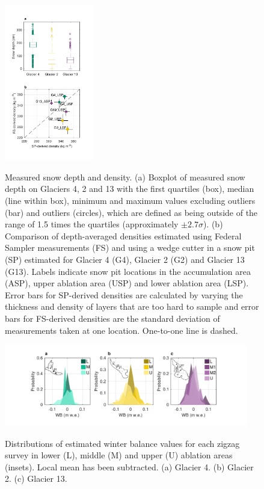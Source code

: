 \documentclass[twocolumn, letterpaper]{igs}
\begin{document}
\begin{figure}
	\centering
	\includegraphics[width =0.35\textwidth]{DepthBoxplot_SPvsFS.pdf}\\
	\caption{Measured snow depth and density. (a) Boxplot of measured snow depth on Glaciers 4, 2 and 13 with the first quartiles (box), median (line within box), minimum and maximum values excluding outliers (bar) and outliers (circles), which are defined as being outside of the range of 1.5 times the quartiles (approximately $\pm2.7\sigma$). (b) Comparison of depth-averaged densities estimated using Federal Sampler measurements (FS) and using a wedge cutter in a snow pit (SP) estimated for Glacier 4 (G4), Glacier 2 (G2) and Glacier 13 (G13). Labels indicate snow pit locations in the accumulation area (ASP), upper ablation area (USP) and lower ablation area (LSP). Error bars for SP-derived densities are calculated by varying the thickness and density of layers that are too hard to sample and error bars for FS-derived densities are the standard deviation of measurements taken at one location. One-to-one line is dashed.}
	\label{fig:DepthBoxplot_SPvsFS}
\end{figure}

\begin{figure}
	\centering
	\includegraphics[width =0.95\textwidth]{ZigzagHistogram.pdf}\\
	\caption{Distributions of estimated winter balance values for each zigzag survey in lower (L), middle (M) and upper (U) ablation areas (insets). Local mean has been subtracted. (a) Glacier 4. (b) Glacier 2. (c) Glacier 13.}
	\label{fig:ZigzagHistogram}
\end{figure}
\end{document}
